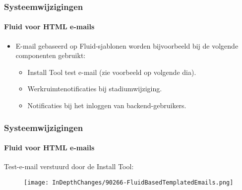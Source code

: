 
\begin{frame}[fragile]
	\frametitle{Systeemwijzigingen}
	\framesubtitle{Fluid voor HTML e-mails}

	\begin{itemize}
		\item E-mail gebaseerd op Fluid-sjablonen worden bijvoorbeeld bij de volgende componenten gebruikt:

			\begin{itemize}
				\item Install Tool test e-mail (zie voorbeeld op volgende dia).
				\item Werkruimtenotificaties bij stadiumwijziging.
				\item Notificaties bij het inloggen van backend-gebruikers.
			\end{itemize}

	\end{itemize}

\end{frame}


\begin{frame}[fragile]
	\frametitle{Systeemwijzigingen}
	\framesubtitle{Fluid voor HTML e-mails}

	Test-e-mail verstuurd door de Install Tool:

	\begin{figure}
		\texttt{[image: InDepthChanges/90266-FluidBasedTemplatedEmails.png]}
	\end{figure}

\end{frame}


